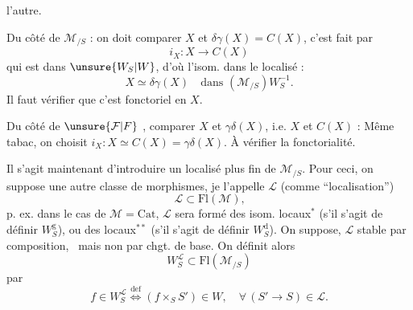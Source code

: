l'autre.

Du côté de $\mathcal M_{/S}$ : on doit comparer $X$ et $\delta\gamma(X)=C(X)$, c'est fait par
\[
i_X:X\longrightarrow C(X)
\]
qui est dans $\unsure{W_S|W}$, d'où l'isom. dans le localisé :
\[
X\simeq\delta\gamma(X)\quad\text{dans }(\mathcal M_{/S})W_S^{-1}\text{.}
\]
Il faut vérifier que c'est fonctoriel en $X$.

Du côté de $\unsure{\mathcal F|F}$ , comparer $X$ et $\gamma\delta(X)$, i.e. $X$ et $C(X)$ : Même tabac, on choisit $i_X:X\simeq C(X)=\gamma\delta(X)$. À vérifier la fonctorialité.

Il s'agit maintenant d'introduire un localisé plus fin de $\mathcal M_{/S}$. Pour ceci, on suppose  une autre classe de morphismes, je l'appelle $\mathcal L$ (comme ``localisation'')
\[
\mathcal L\subset\mathrm{Fl}(\mathcal M)\text{,}
\]
p. ex. dans le cas de $\mathcal M=\mathrm{Cat}$, $\mathcal L$  sera formé des  isom. locaux$^{*}$ (s'il s'agit de définir $W_S^{\mathrm g}$), ou des  locaux$^{**}$ (s'il s'agit de définir $W_S^{\mathrm d}$). On suppose,  $\mathcal L$ stable par composition, \,\unsure{,} mais non par chgt. de base.
On définit alors
\[
W_S^{\mathcal L}\subset\mathrm{Fl}(\mathcal M_{/S})
\]
par
\[
f\in W_S^{\mathcal L}\overset{\mathrm{def}}{\Longleftrightarrow}(f\times_S S')\in W,\quad\forall\,(S'\longrightarrow S)\in\mathcal L\text{.}
\]
